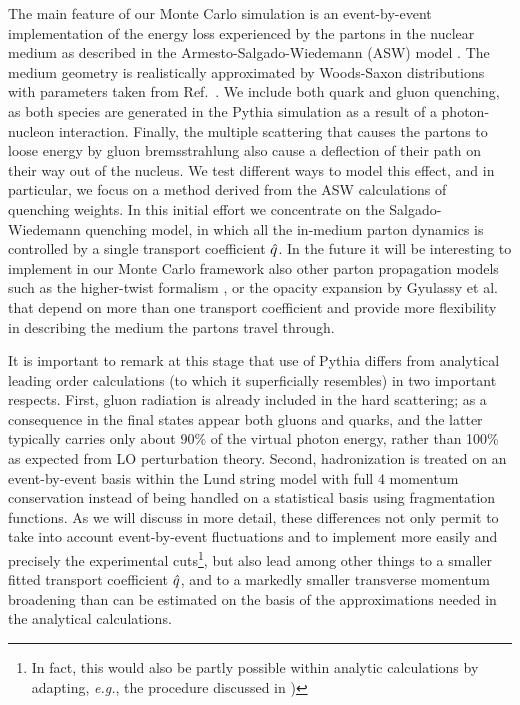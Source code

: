 The main feature of our Monte Carlo simulation is an event-by-event implementation of the energy loss experienced by the partons in the nuclear medium as described in the Armesto-Salgado-Wiedemann (ASW) model \cite{Salgado:2002cd,Salgado:2003gb,Armesto:2003jh}. The medium geometry is realistically approximated by Woods-Saxon distributions with parameters taken from Ref.~\cite{DeJager:1987qc}. We include both quark and gluon quenching, as both species are generated in the Pythia simulation as a result of a photon-nucleon interaction. Finally, the multiple scattering that causes the partons to loose energy by gluon bremsstrahlung also cause a deflection of their path on their way out of the nucleus. We test different ways to model this effect, and in particular, we focus on a method derived from the ASW calculations of quenching weights. In this initial effort we concentrate on the Salgado-Wiedemann quenching model, in which all the in-medium parton dynamics is controlled by a single transport coefficient ${\hat q}$. In the future it will be interesting to implement in our Monte Carlo framework also other parton propagation models such as the higher-twist formalism \cite{HT,majumder}, or the opacity expansion by Gyulassy et al. \cite{Gyulassy:1999zd,Djordjevic:2003zk} that depend on more than one transport coefficient and provide more flexibility in describing the medium the partons travel through.

It is important to remark at this stage that use of Pythia differs from analytical leading order calculations (to which it superficially resembles) in two important respects. First, gluon radiation is already included in the hard scattering; as a consequence in the final states appear both gluons and quarks, and the latter typically carries only about 90\% of the virtual photon energy, rather than 100\% as expected from LO perturbation theory. Second, hadronization is treated on an event-by-event basis within the Lund string model with full 4 momentum conservation instead of being handled on a statistical basis using fragmentation functions. As we will discuss in more detail, these differences not only permit to take into account event-by-event fluctuations and to implement more easily and precisely the experimental cuts\footnote{In fact, this would also be partly possible within analytic calculations by adapting, {\it e.g.}, the procedure discussed in \cite{Dainese:2004te})}, but also lead among other things to a smaller fitted transport coefficient ${\hat q}$, and to a markedly smaller transverse momentum broadening than can be estimated on the basis of the approximations needed in the analytical calculations.


